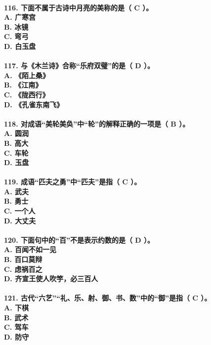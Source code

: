 \documentclass[UTF8]{ctexart} %
\begin{document}
\paragraph{
116. 下面不属于古诗中月亮的美称的是（ \color{red}C\color{black} ）。 \\
    A. 广寒宫 \\
    B. 冰镜 \\
    C. 弯弓 \\
    D. 白玉盘
}
\paragraph{
117. 与《木兰诗》合称“乐府双璧”的是（ \color{red}D\color{black} ）。 \\
    A. 《陌上桑》 \\
    B. 《江南》 \\
    C. 《陇西行》 \\
    D. 《孔雀东南飞》
}
\paragraph{
118. 对成语“美轮美奂”中“轮”的解释正确的一项是（ \color{red}B\color{black} ）。 \\
    A. 圆润 \\
    B. 高大 \\
    C. 车轮 \\
    D. 玉盘
}
\paragraph{
119. 成语“匹夫之勇”中“匹夫”是指（ \color{red}C\color{black} ）。 \\
    A. 武夫 \\
    B. 勇士 \\
    C. 一个人 \\
    D. 大丈夫
}
\paragraph{
120. 下面句中的“百”不是表示约数的是（ \color{red}D\color{black} ）。 \\
    A. 百闻不如一见 \\
    B. 百口莫辩 \\
    C. 虑祸百之 \\
    D. 齐宣王使人吹竽，必三百人
}
\paragraph{
121. 古代“六艺”“礼、乐、射、御、书、数”中的“御”是指（ \color{red}C\color{black} ）。 \\
    A. 下棋 \\
    B. 武术 \\
    C. 驾车 \\
    D. 防守
}
\end{document}
